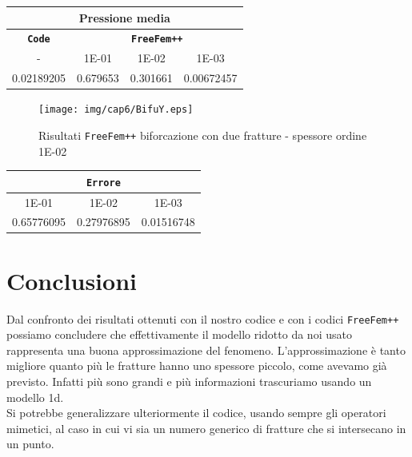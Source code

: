 \begin{center}
\begin{tabular}{|c|c|c|c|}
\hline
\multicolumn{4}{|c|}{Pressione media} \\
\hline
\textbf{\texttt{Code}} & \multicolumn{3}{|c|}{\textbf{\texttt{FreeFem++}}} \\
\hline
- & \multicolumn{1}{|c|}{1E-01} & 1E-02 & 1E-03 \\
\hline
0.02189205 & 0.679653 & 0.301661 & 0.00672457 \\
\hline
\end{tabular}
\end{center}

\begin{figure}[h!]
\centering
\texttt{[image: img/cap6/BifuY.eps]}
\caption{Risultati \texttt{FreeFem++} biforcazione con due fratture - spessore ordine 1E-02 }\label{Biforcazione2Frat1E-02}
\end{figure}

\begin{center}
\begin{tabular}{|c|c|c|}
\hline
  \multicolumn{3}{|c|}{\textbf{\texttt{Errore}}} \\ 
\hline
\multicolumn{1}{|c|}{1E-01} & 1E-02 & 1E-03 \\
\hline
0.65776095 & 0.27976895 & 0.01516748 \\
\hline
\end{tabular}
\end{center}

\section{Conclusioni}
Dal confronto dei risultati ottenuti con il nostro codice e con i codici \texttt{FreeFem++} possiamo concludere che effettivamente il modello ridotto da noi usato rappresenta una buona approssimazione del fenomeno. L'approssimazione è tanto migliore quanto più le fratture hanno uno spessore piccolo, come avevamo già previsto. Infatti più sono grandi e più informazioni trascuriamo usando un modello 1d. \\
\noindent Si potrebbe generalizzare ulteriormente il codice, usando sempre gli operatori mimetici, al caso in cui vi sia un numero generico di fratture che si intersecano in un punto. 
